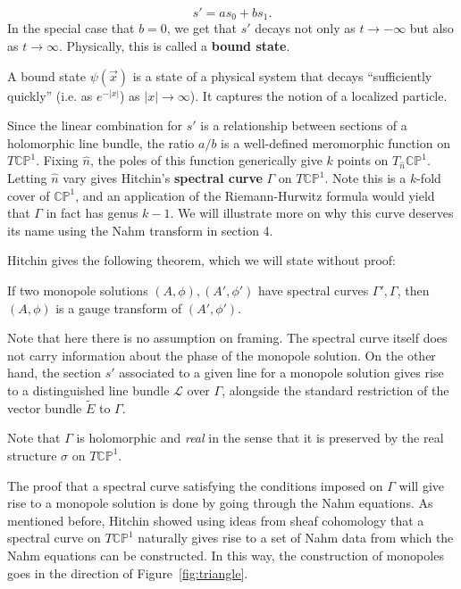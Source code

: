 	\begin{equation}
		s' = a s_0 + b s_1.
	\end{equation}
	In the special case that $b=0$, we get that $s'$ decays not only as $t \to -\infty$ but also as $t \to \infty$. Physically, this is called a \textbf{bound state}.
	\begin{defn}
		A bound state $\psi(\vec x)$ is a state of a physical system that decays ``sufficiently quickly'' (i.e. as $e^{-|x|}$) as $|x| \to \infty$). It captures the notion of a localized particle. 
	\end{defn}
	Since the linear combination for $s'$ is a relationship between sections of a holomorphic line bundle, the ratio $a/b$ is a well-defined meromorphic function on $T \mathbb{CP}^1$. Fixing $\hat n$, the poles of this function generically give $k$ points on $T_{\hat n} \mathbb{CP}^1$. Letting $\hat n$ vary gives Hitchin's \textbf{spectral curve} $\Gamma$ on $T \mathbb {CP}^1$. Note this is a $k$-fold cover of $\mathbb{CP}^1$, and an application of the Riemann-Hurwitz formula would yield that $\Gamma$ in fact has genus $k-1$. We will illustrate more on why this curve deserves its name using the Nahm transform in section 4.
	
	Hitchin gives the following theorem, which we will state without proof:
	\begin{theorem}[Hitchin]
		If two monopole solutions $(A, \phi), (A', \phi')$ have spectral curves $\Gamma', \Gamma$, then $(A, \phi)$ is a gauge transform of $(A', \phi')$.
	\end{theorem}
	Note that here there is no assumption on framing. The spectral curve itself does not carry information about the phase of the monopole solution. On the other hand, the section $s'$ associated to a given line for a monopole solution gives rise to a distinguished line bundle $\mathcal L$ over $\Gamma$, alongside the standard restriction of the vector bundle $\tilde E$ to $\Gamma$.
	
	Note that $\Gamma$ is holomorphic and \emph{real} in the sense that it is preserved by the real structure $\sigma$ on $T\mathbb{CP}^1$.
	
	The proof that a spectral curve satisfying the conditions imposed on $\Gamma$ will give rise to a monopole solution is done by going through the Nahm equations. As mentioned before, Hitchin \cite{hitchin1983} showed using ideas from sheaf cohomology that a spectral curve on $T \mathbb{CP}^1$ naturally gives rise to a set of Nahm data from which the Nahm equations can be constructed. In this way, the construction of monopoles goes in the direction of Figure~\ref{fig:triangle}.
	
